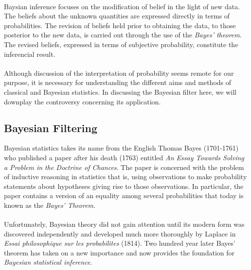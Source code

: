 \documentclass{article}
\theoremstyle{definition}
\theoremstyle{remark}
\begin{document}
\\
Baysian inference focuses on the modification of belief in the light of new data. The beliefs about the unknown quantities are expressed directly in terms of probabilities. The revision of beliefs held prior to obtaining the data, to those posterior to the new data, is carried out through the use of the \emph{Bayes' theorem}. The revised beliefs, expressed in terms of subjective probability, constitute the inferencial result.\\
\\
Although discussion of the interpretation of probability seems remote for our purpose, it is necessary for understanding the different aims and methods of classical and Bayesian statistics. In discussing the Bayesian filter here, we will downplay the controversy concerning its application.







\subsection{Bayesian Filtering} %

Bayesian statistics takes its name from the English Thomas Bayes (1701-1761) who published a paper after his death (1763) entitled \textit{An Essay Towards Solving a Problem in the Doctrine of Chances}. The paper is concerned with the problem of inductive reasoning in statistics that is, using observations to make probability statements about hypotheses giving rise to those observations.  In particular, the paper contains a version of an equality among several probabilities that today is known as the \textit{Bayes' Theorem}. \\
\\
Unfortunately, Bayesian theory did not gain attention until its modern form was discovered independently and developed much more thoroughly by Laplace in \emph{Essai philosophique sur les probabilites} (1814). Two hundred year later Bayes' theorem has taken on a new importance and now provides the foundation for \emph{Bayesian statistical inference}.
\end{document}
